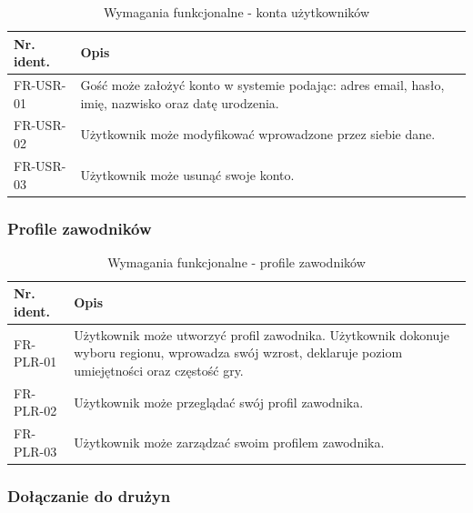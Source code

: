 \begin{table}[H]
\centering\small
\caption{Wymagania funkcjonalne - konta użytkowników}
\label{tab:szablon}
\begin{tabularx}{\linewidth}{|p{.2\linewidth}|X|}\hline
Nr. ident. & Opis \\ \hline\hline

FR-USR-01 & Gość może założyć konto w systemie podając: adres email, hasło, imię, nazwisko oraz datę urodzenia. \\ \hline
FR-USR-02 & Użytkownik może modyfikować wprowadzone przez siebie dane.  \\ \hline
FR-USR-03 & Użytkownik może usunąć swoje konto.  \\ \hline

\end{tabularx}
\end{table}

\subsubsection{Profile zawodników}


\begin{table}[H]
\centering\small
\caption{Wymagania funkcjonalne - profile zawodników}
\label{tab:szablon}
\begin{tabularx}{\linewidth}{|p{.2\linewidth}|X|}\hline
Nr. ident. & Opis \\ \hline\hline

FR-PLR-01 & Użytkownik może utworzyć profil zawodnika. Użytkownik dokonuje wyboru regionu, wprowadza swój wzrost, deklaruje poziom umiejętności oraz częstość gry.   \\ \hline
FR-PLR-02 & Użytkownik może przeglądać swój profil zawodnika.\\ \hline
FR-PLR-03 & Użytkownik może zarządzać swoim profilem zawodnika. \\ \hline

\end{tabularx}
\end{table}

\subsubsection{Dołączanie do drużyn}

